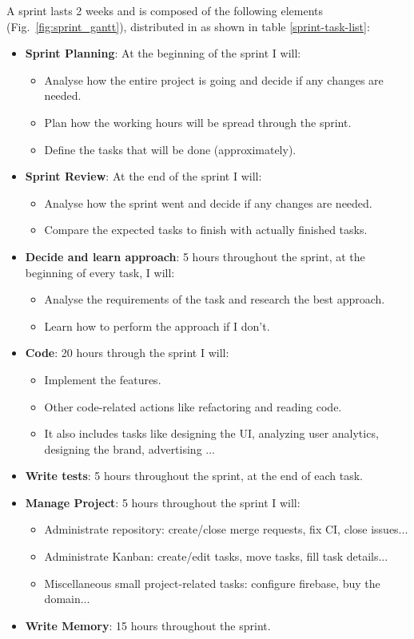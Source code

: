 A sprint lasts 2 weeks and is composed of the following elements (Fig.~\ref{fig:sprint_gantt}), distributed in as shown in table \ref{sprint-task-list}:
\begin{itemize}
    \item \textbf{Sprint Planning}: At the beginning of the sprint I will:
    \begin{itemize}
        \item Analyse how the entire project is going and decide if any changes are needed.
        \item Plan how the working hours will be spread through the sprint.
        \item Define the tasks that will be done (approximately).
    \end{itemize}
    \item \textbf{Sprint Review}\label{sec:sprint-review}: At the end of the sprint I will:
    \begin{itemize}
        \item Analyse how the sprint went and decide if any changes are needed.
        \item Compare the expected tasks to finish with actually finished tasks.
    \end{itemize}
    \item \textbf{Decide and learn approach}: 5 hours throughout the sprint, at the beginning of every task, I will:
    \begin{itemize}
        \item Analyse the requirements of the task and research the best approach.
        \item Learn how to perform the approach if I don't.
    \end{itemize}
    \item \textbf{Code}: 20 hours through the sprint I will:
    \begin{itemize}
        \item Implement the features.
        \item Other code-related actions like refactoring and reading code.
        \item It also includes tasks like designing the UI, analyzing user analytics, designing the brand, advertising ...
    \end{itemize}
    \item \textbf{Write tests}: 5 hours throughout the sprint, at the end of each task.
    \item \textbf{Manage Project}: 5 hours throughout the sprint I will:
    \begin{itemize}
        \item Administrate repository: create/close merge requests, fix CI, close issues...
        \item Administrate Kanban: create/edit tasks, move tasks, fill task details...
        \item Miscellaneous small project-related tasks: configure firebase, buy the domain...
    \end{itemize}
    \item \textbf{Write Memory}: 15 hours throughout the sprint.
\end{itemize}


